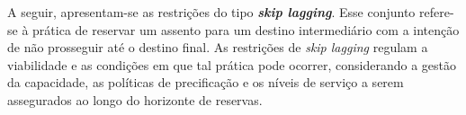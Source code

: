
A seguir, apresentam-se as restrições do tipo \textbf{\textit{skip lagging}}. Esse conjunto refere-se à prática de reservar um assento para um destino intermediário com a intenção de não prosseguir até o destino final. As restrições de \textit{skip lagging} regulam a viabilidade e as condições em que tal prática pode ocorrer, considerando a gestão da capacidade, as políticas de precificação e os níveis de serviço a serem assegurados ao longo do horizonte de reservas.

